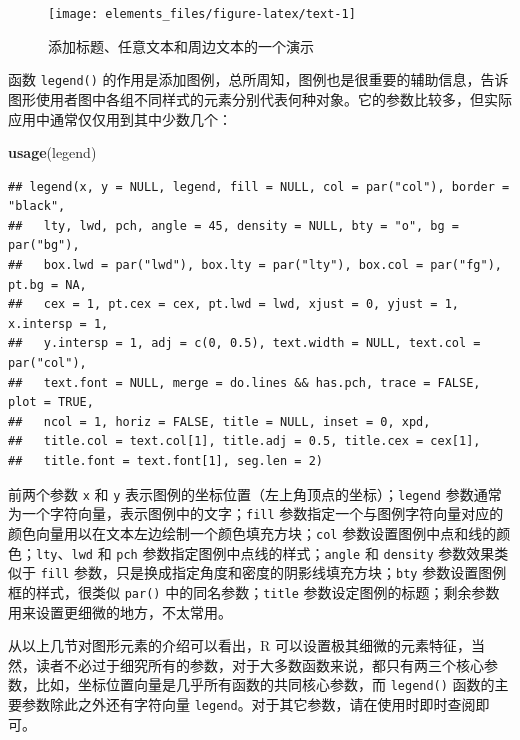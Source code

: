 \documentclass[
  b5paper,
  UTF8,twoside]{book}
\newenvironment{Shaded}{\begin{snugshade}}{\end{snugshade}}
\newcommand{\FunctionTok}[1]{\textcolor[rgb]{0.13,0.29,0.53}{\textbf{#1}}}
\newcommand{\NormalTok}[1]{#1}
\begin{document}
\begin{figure}

{\centering \texttt{[image: elements\_files/figure-latex/text-1]} 

}

\caption{添加标题、任意文本和周边文本的一个演示}\label{fig:text}
\end{figure}

函数 \texttt{legend()} 的作用是添加图例，总所周知，图例也是很重要的辅助信息，告诉图形使用者图中各组不同样式的元素分别代表何种对象。它的参数比较多，但实际应用中通常仅仅用到其中少数几个：

\begin{Shaded}
\begin{Highlighting}[]
\FunctionTok{usage}\NormalTok{(legend)}
\end{Highlighting}
\end{Shaded}

\begin{verbatim}
## legend(x, y = NULL, legend, fill = NULL, col = par("col"), border = "black",
##   lty, lwd, pch, angle = 45, density = NULL, bty = "o", bg = par("bg"),
##   box.lwd = par("lwd"), box.lty = par("lty"), box.col = par("fg"), pt.bg = NA,
##   cex = 1, pt.cex = cex, pt.lwd = lwd, xjust = 0, yjust = 1, x.intersp = 1,
##   y.intersp = 1, adj = c(0, 0.5), text.width = NULL, text.col = par("col"),
##   text.font = NULL, merge = do.lines && has.pch, trace = FALSE, plot = TRUE,
##   ncol = 1, horiz = FALSE, title = NULL, inset = 0, xpd,
##   title.col = text.col[1], title.adj = 0.5, title.cex = cex[1],
##   title.font = text.font[1], seg.len = 2)
\end{verbatim}

前两个参数 \texttt{x} 和 \texttt{y} 表示图例的坐标位置（左上角顶点的坐标）；\texttt{legend} 参数通常为一个字符向量，表示图例中的文字；\texttt{fill} 参数指定一个与图例字符向量对应的颜色向量用以在文本左边绘制一个颜色填充方块；\texttt{col} 参数设置图例中点和线的颜色；\texttt{lty}、\texttt{lwd} 和 \texttt{pch} 参数指定图例中点线的样式；\texttt{angle} 和 \texttt{density} 参数效果类似于 \texttt{fill} 参数，只是换成指定角度和密度的阴影线填充方块；\texttt{bty} 参数设置图例框的样式，很类似 \texttt{par()} 中的同名参数；\texttt{title} 参数设定图例的标题；剩余参数用来设置更细微的地方，不太常用。

从以上几节对图形元素的介绍可以看出，R 可以设置极其细微的元素特征，当然，读者不必过于细究所有的参数，对于大多数函数来说，都只有两三个核心参数，比如，坐标位置向量是几乎所有函数的共同核心参数，而 \texttt{legend()} 函数的主要参数除此之外还有字符向量 \texttt{legend}。对于其它参数，请在使用时即时查阅即可。
\end{document}
